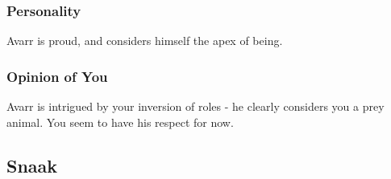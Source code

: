 \documentclass[letterpaper,10pt,twoside,twocolumn,openany]{book}
\begin{document}
\subsubsection{Personality}
Avarr is proud, and considers himself the apex of being. 

\subsubsection{Opinion of You}
Avarr is intrigued by your inversion of roles - he clearly considers you a prey animal.
You seem to have his respect for now.






\subsection{Snaak}
\end{document}
